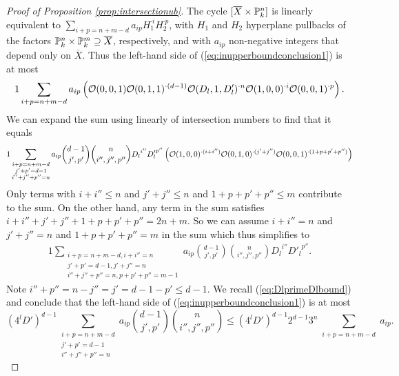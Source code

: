 \begin{proof}[Proof of Proposition \ref{prop:intersectionub}]
The cycle $[\overline X\times{\mathbb{P}}_k^n]$ is linearly equivalent to 
$\sum_{i+p=n+m-d} a_{ip}H_1^{\cdot i}  H_2^{\cdot p}$, with $H_{1}$ and $H_2$
hyperplane pullbacks of the factors ${\mathbb{P}}_k^n\times {\mathbb{P}}_k^m\supseteq
\overline X$, respectively, and with
$a_{ip}$ non-negative integers that depend only on $\overline X$.
Thus the left-hand side of (\ref{eq:inupperboundconclusion1}) is at
most %
\begin{alignat*}1
\sum_{i+p = n+m-d} a_{ip}
\left(  \cO(0,0,1)\cO(0,1,1)^{\cdot (d-1)}
\cO(D_l,1,D'_l)^{\cdot n}\cO(1,0,0)^{\cdot i}\cO(0,0,1)^{\cdot p}\right).
\end{alignat*}
We can expand the sum using linearly of intersection
numbers to find that it equals
\begin{alignat*}1
  \sum_{\substack{i+p=n+m-d\\ j'+p'=d-1\\i''+j''+p'' = n}} a_{ip} {d-1 \choose j',p'}
  {n\choose i'',j'',p''}{D_l}^{i''} {D'_l}^{p''} \left(\cO(1,0,0)^{\cdot
    (i+i'')} \cO(0,1,0)^{\cdot (j'+j'')}\cO(0,0,1)^{\cdot(1+p+p'+p'')}\right)
\end{alignat*}
Only terms with $i+i''\le n$ and $j'+j''\le n$ and $1+p+p'+p''\le m$
contribute to the sum.
On the other hand, any term in the sum satisfies
$i+i'' + j'+j'' + 1+p+p'+p'' =2n+m$. 
So we can assume $i+i''=n$ and $j'+j''=n$ and $1+p+p'+p''=m$ in the
sum
which thus simplifies to
\begin{alignat*}1
  \sum_{\substack{i+p=n+m-d, i+i''=n \\ j'+p'=d-1,j'+j''=n \\ i''+j''+p''=n,p+p'+p''=m-1}} a_{ip} {d-1\choose
    j',p'} {n\choose i'',j'',p''} {D_l}^{i''} {D'_l}^{p''}. 
\end{alignat*}
Note $i''+p''  = n-j'' =j'  = d-1-p'\le d-1$. 
We recall (\ref{eq:DlprimeDlbound}) and conclude that the 
 left-hand side of (\ref{eq:inupperboundconclusion1}) is at most
\begin{equation}
  \label{eq:intersectionnumberub2}
  (4^lD')^{d-1}
  \sum_{\substack{i+p=n+m-d\\ j'+p'=d-1\\i''+j''+p'' = n}}
 a_{ip}
 {d-1\choose
    j',p'} {n\choose i'',j'',p''} 
\le
 (4^l D')^{d-1}2^{d-1}3^n \sum_{\substack{i+p=n+m-d}}
 a_{ip}.
\end{equation}



\end{proof}

